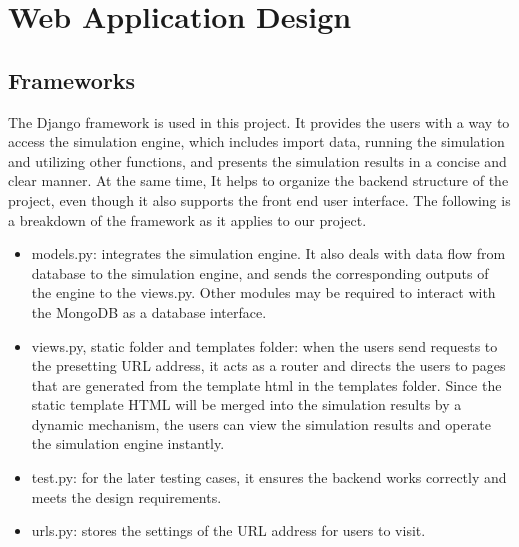 \documentclass[12pt]{article}
\begin{document}
\section{Web Application Design}

\subsection{Frameworks}
The Django framework is used in this project. It provides the users with a way to access the simulation engine, which includes import data, running the simulation and utilizing other functions, and presents the simulation results in a concise and clear manner. At the same time, It helps to organize the backend structure of the project, even though it also supports the front end user interface. The following is a breakdown of the framework as it applies to our project.

\begin{itemize}  
\item models.py: 
integrates the simulation engine. It also deals with data flow from database to the simulation engine, and sends the corresponding outputs of the engine to the views.py. Other modules may be required to interact with the MongoDB as a database interface.
\item views.py, static folder and templates folder: 
when the users send requests to the presetting URL address, it acts as a router and directs the users to pages that are generated from the template html in the templates folder. Since the static template HTML will be merged into the simulation results by a dynamic mechanism, the users can view the simulation results and operate the simulation engine instantly.
\item test.py: 
for the later testing cases, it ensures the backend works correctly and meets the design requirements.
\item  urls.py: 
stores the settings of the URL address for users to visit.
\end{itemize}
\end{document}
